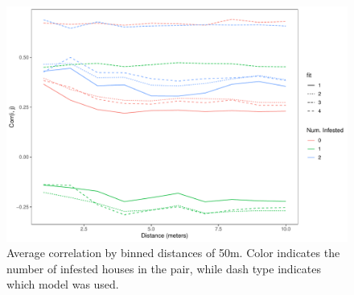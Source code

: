 \documentclass{scrartcl}
\begin{document}
\begin{figure}
  \centering
  \includegraphics[width=\linewidth]{mean-corr-all}
  \caption{Average correlation by binned distances of 50m. Color
    indicates the number of infested houses in the pair, while dash
    type indicates which model was used.}
  \label{fig:mean-corr-all}
\end{figure}





\end{document}
